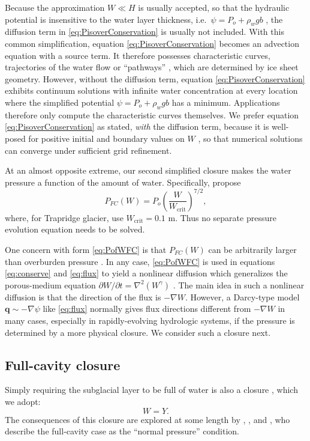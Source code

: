 \documentclass[gmd]{copernicus}   %
\begin{document}
Because the approximation $W\ll H$ is usually accepted, so that the hydraulic potential is insensitive to the water layer thickness, i.e.~$\psi = P_o + \rho_w g b$ \citep{LeBrocqetal2009}, the diffusion term in \eqref{eq:PisoverConservation} is usually not included.  With this common simplification, equation \eqref{eq:PisoverConservation} becomes an advection equation with a source term.  It therefore possesses characteristic curves, trajectories of the water flow or ``pathways'' \citep{Livingstoneetal2013}, which are determined by ice sheet geometry.  However, without the diffusion term, equation \eqref{eq:PisoverConservation} exhibits continuum solutions with infinite water concentration at every location where the simplified potential $\psi = P_o + \rho_w g b$ has a minimum.  Applications therefore only compute the characteristic curves themselves.  We prefer equation \eqref{eq:PisoverConservation} as stated, \emph{with} the diffusion term, because it is well-posed for positive initial and boundary values on $W$ \citep[compare][]{Hewittetal2012}, so that numerical solutions can converge under sufficient grid refinement.

At an almost opposite extreme, our second simplified closure makes the water pressure a function of the amount of water.  Specifically, \cite{FlowersClarke2002_theory} propose
\begin{equation}
P_{FC}(W) = P_o \left(\frac{W}{W_{\text{crit}}}\right)^{7/2}, \label{eq:PofWFC}
\end{equation}
where, for Trapridge glacier, \cite{FlowersClarke2002_trapridge} use $W_{\text{crit}}=0.1$ m.  Thus no separate pressure evolution equation needs to be solved.

One concern with form \eqref{eq:PofWFC} is that $P_{FC}(W)$ can be arbitrarily larger than overburden pressure \citep{Schoofetal2012}.  In any case, \eqref{eq:PofWFC} is used in equations \eqref{eq:conserve} and \eqref{eq:flux} to yield a nonlinear diffusion which generalizes the porous-medium equation $\partial W/\partial t = \nabla^2 (W^\gamma)$ \citep{VazquezPME}.  The main idea in such a nonlinear diffusion is that the direction of the flux is $-\nabla W$.  However, a Darcy-type model $\mathbf{q} \sim -\nabla \psi$ like \eqref{eq:flux} normally gives flux directions different from $-\nabla W$ in many cases, especially in rapidly-evolving hydrologic systems, if the pressure is determined by a more physical closure.  We consider such a closure next.

\subsection{Full-cavity closure}  Simply requiring the subglacial layer to be full of water is also a closure \citep{Bartholomausetal2011}, which we adopt:
\begin{equation}
W = Y.\label{eq:strongclosure}
\end{equation}
The consequences of this closure are explored at some length by \cite{Schoofetal2012}, \cite{Hewittetal2012}, and \cite{Werderetal2013}, who describe the full-cavity case as the ``normal pressure'' condition.
\end{document}
